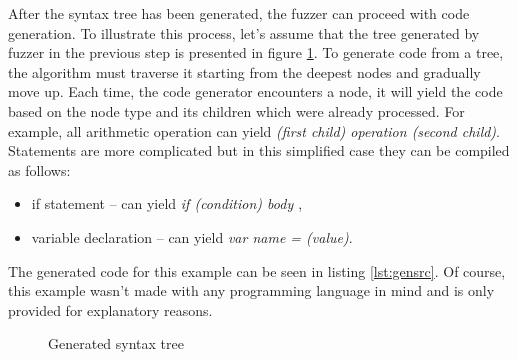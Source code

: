 After the syntax tree has been generated, the fuzzer can proceed with code generation. To illustrate this process, let's assume that the tree generated by fuzzer in the previous step is presented in figure \ref{fig:gentree}. To generate code from a tree, the algorithm must traverse it starting from the deepest nodes and gradually move up. Each time, the code generator encounters a node, it will yield the code based on the node type and its children which were already processed. For example, all arithmetic operation can yield \textit{(first child) operation (second child)}. Statements are more complicated but in this simplified case they can be compiled as follows:
\begin{itemize}
    \item if statement – can yield \textit{if (condition) { body }},
    \item variable declaration – can yield \textit{var name = (value)}.
\end{itemize}
The generated code for this example can be seen in listing \ref{lst:gensrc}. Of course, this example wasn't made with any programming language in mind and is only provided for explanatory reasons.

\begin{figure}[h!]
    \centering

    
    \caption{Generated syntax tree}
    \label{fig:gentree}
\end{figure}

